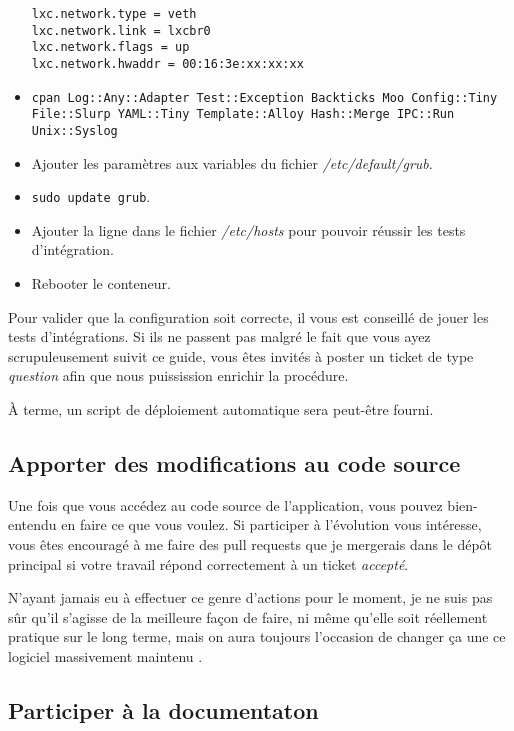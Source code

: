 \begin{itemize}
		{\tt{}lxc.network.type = veth\\
lxc.network.link = lxcbr0\\
lxc.network.flags = up\\
lxc.network.hwaddr = 00:16:3e:xx:xx:xx}
	\item {\tt cpan Log::Any::Adapter Test::Exception Backticks Moo Config::Tiny File::Slurp YAML::Tiny Template::Alloy Hash::Merge IPC::Run Unix::Syslog}
	\item Ajouter les paramètres  aux variables  du fichier \emph{/etc/default/grub}.
	\item {\tt sudo update grub}.
	\item Ajouter la ligne  dans le fichier \emph{/etc/hosts} pour pouvoir réussir les tests d'intégration.
	\item Rebooter le conteneur.
\end{itemize}

Pour valider que la configuration soit correcte, il vous est conseillé de jouer les tests d'intégrations.
Si ils ne passent pas malgré le fait que vous ayez scrupuleusement suivit ce guide, vous êtes invités à poster un ticket de type \emph{question} afin que nous puissission enrichir la procédure.

À terme, un script de déploiement automatique sera peut-être fourni.

\subsection{Apporter des modifications au code source}

Une fois que vous accédez au code source de l'application, vous pouvez bien-entendu en faire ce que vous voulez.
Si participer à l'évolution vous intéresse, vous êtes encouragé à me faire des pull requests que je mergerais dans le dépôt principal si votre travail répond correctement à un ticket \emph{accepté}.

N'ayant jamais eu à effectuer ce genre d'actions pour le moment, je ne suis pas sûr qu'il s'agisse de la meilleure façon de faire, ni même qu'elle soit réellement pratique sur le long terme, mais on aura toujours l'occasion de changer ça une ce logiciel massivement maintenu \Winkey.
\subsection{Participer à la documentaton}
